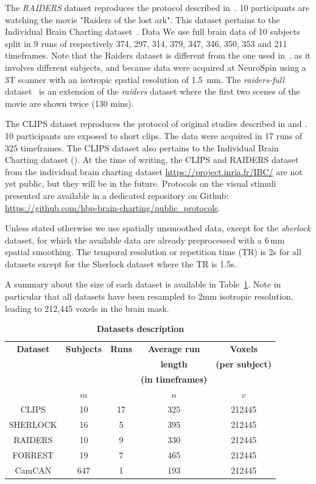 The \emph{RAIDERS} dataset reproduces the protocol described
in~\cite{haxby2011common}. 10 participants are watching the movie "Raiders
of the lost ark". This dataset pertains to the Individual Brain Charting
dataset~\cite{ibc, ibc2}.
% 
Data 
% 
We use full brain data of 10 subjects split in 9 runs of respectively 374, 297, 314, 379, 347, 346, 350, 353 and 211 timeframes.
%
Note that the Raiders dataset is different from the one used in~\cite{chen2015reduced}, as it involves different subjects, and because data were acquired at NeuroSpin using a 3T scanner with an isotropic spatial resolution of 1.5 mm.
The \emph{raiders-full} dataset~\cite{ibc, ibc2} is an extension of the \emph{raiders} dataset where the first two scenes of the movie are shown twice (130 mins).

The CLIPS dataset reproduces the protocol of original studies described in
\cite{nishimoto2011reconstructing} and \cite{huth2012continuous}. 10
participants are exposed to short clips. The data were acquired in 17 runs of 325 timeframes. 
%
The CLIPS dataset also pertains to the Individual Brain Charting dataset
(\cite{ibc, ibc2}).
%
At the time of writing, the CLIPS and RAIDERS dataset from the individual brain charting dataset \url{https://project.inria.fr/IBC/} are not yet public, but they will be in the future. Protocols on the visual stimuli presented are available in a dedicated repository on Github: \url{https://github.com/hbp-brain-charting/public_protocols}.

Unless stated otherwise we use spatially unsmoothed data, except for the
\emph{sherlock} dataset, for which the available data are already preprocessed
with a 6\,mm spatial smoothing. The temporal resolution or repetition time (TR) is 2s for all datasets except for the Sherlock dataset where the TR is 1.5s.
%

A summary about the size of each dataset is available in Table~\ref{tab:dataset_desc2}. Note in particular that all datasets have been resampled to 2mm isotropic resolution, leading to 212,445 voxels in the brain mask.
\begin{table}
	\begin{tabular}{|c|c|c|c|c|}
		\hline
		\textbf{Dataset} & \textbf{Subjects} & \textbf{Runs} & \textbf{Average run} & \textbf{Voxels} \\
                     && & \textbf{length} & \textbf{(per subject)} \\
                     && & \textbf{(in timeframes)} &  \\
                     &$m$& $ $ & $n$ &$v$  \\
		\hline
		CLIPS & 10 & 17 & 325 & 212445\\ 
		\hline
		SHERLOCK & 16 & 5 & 395 & 212445 \\ 
		\hline
		RAIDERS & 10 & 9 & 330 & 212445 \\
		\hline 
		FORREST & 19 & 7 & 465 & 212445\\
		\hline
		CamCAN & 647 & 1 & 193 & 212445 \\
		\hline
	\end{tabular}
  \caption{\textbf{Datasets description}}
  \label{tab:dataset_desc2}
\end{table}

